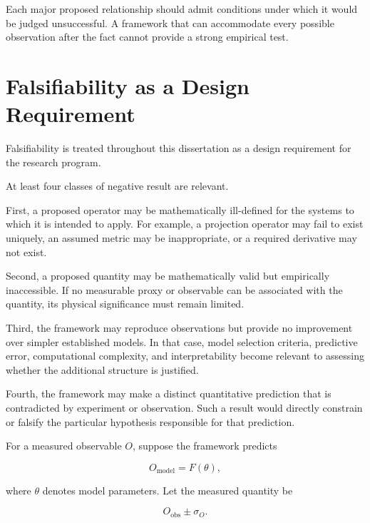 \documentclass[12pt,oneside]{book}
\begin{document}
Each major proposed relationship should admit conditions under
which it would be judged unsuccessful. A framework that can
accommodate every possible observation after the fact cannot
provide a strong empirical test.


\section{Falsifiability as a Design Requirement}
\label{sec:intro-falsifiability}

Falsifiability is treated throughout this dissertation as a
design requirement for the research program.

At least four classes of negative result are relevant.

First, a proposed operator may be mathematically ill-defined for
the systems to which it is intended to apply. For example, a
projection operator may fail to exist uniquely, an assumed
metric may be inappropriate, or a required derivative may not
exist.

Second, a proposed quantity may be mathematically valid but
empirically inaccessible. If no measurable proxy or observable
can be associated with the quantity, its physical significance
must remain limited.

Third, the framework may reproduce observations but provide no
improvement over simpler established models. In that case, model
selection criteria, predictive error, computational complexity,
and interpretability become relevant to assessing whether the
additional structure is justified.

Fourth, the framework may make a distinct quantitative
prediction that is contradicted by experiment or observation.
Such a result would directly constrain or falsify the
particular hypothesis responsible for that prediction.

For a measured observable \(O\), suppose the framework predicts

\begin{equation}
    O_{\mathrm{model}}
    =
    F(\theta),
    \label{eq:model-observable}
\end{equation}

where \(\theta\) denotes model parameters. Let the measured
quantity be

\begin{equation}
    O_{\mathrm{obs}}
    \pm
    \sigma_O.
\end{equation}
\end{document}
